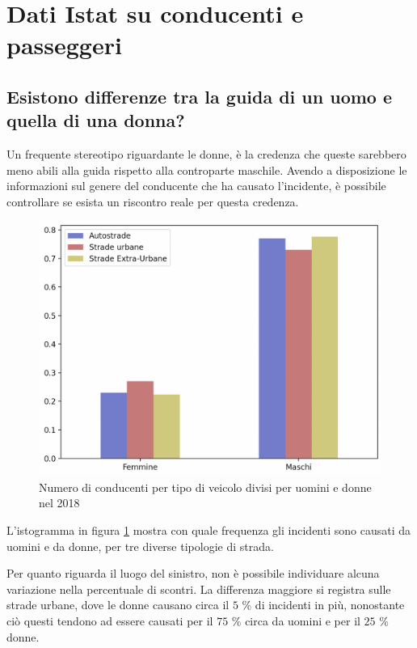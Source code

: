 \documentclass[a4paper,12pt]{report}
\begin{document}
\section{Dati Istat su conducenti e passeggeri}

\subsection{Esistono differenze tra la guida di un uomo e quella di una donna?}


Un frequente stereotipo riguardante le donne, è la credenza che queste  
sarebbero meno abili alla guida rispetto alla controparte maschile. 
Avendo a disposizione le informazioni sul genere del conducente che ha causato l'incidente, 
è possibile controllare se esista un riscontro reale per questa credenza. 

\begin{figure}
    \hfill\includegraphics[width=0.7\linewidth]{../src/incidenti/incidenti_senza_coords/tipo_veicoli/uomo-donna.png}\hspace*{\fill}
    \caption{Numero di conducenti per tipo di veicolo divisi per uomini e donne nel 2018}
    \label{fig:differenza-uomo-donna}
\end{figure}

L'istogramma in figura \ref{fig:differenza-uomo-donna} mostra con quale frequenza 
gli incidenti sono causati da uomini e da donne, per tre diverse tipologie di strada. 

Per quanto riguarda il luogo del sinistro, non è possibile individuare alcuna 
variazione nella percentuale di scontri. 
La differenza maggiore si registra sulle strade urbane, dove le donne causano circa il 
$5$ \% di incidenti in più, nonostante ciò 
questi tendono ad essere causati per il $75$ \% circa da uomini e 
per il $25$ \% donne. 
\end{document}
